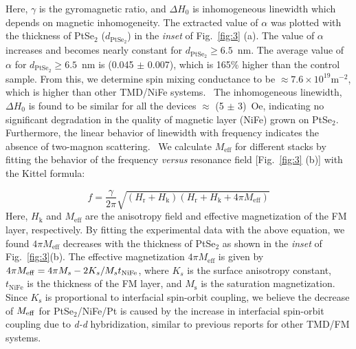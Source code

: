 \documentclass[journal=jacsat,manuscript=article]{achemso}
\begin{document}
 Here, $\gamma$ is the gyromagnetic ratio, and $\Delta H_0$ is inhomogeneous linewidth which depends on magnetic inhomogeneity. The extracted value of $\alpha$ was plotted with the thickness of PtSe$_2$ ($d_\mathrm{PtSe_2}$) in the \textit{inset} of Fig.~\ref{fig:3} (a). 
 The value of $\alpha$ increases and becomes nearly constant for $d_\mathrm{PtSe_2}\geq 6.5$~nm. The average value of $\alpha$ for $d_\mathrm{PtSe_2}\geq 6.5$~nm is (0.045 $\pm$ 0.007), which is 165\% higher than the control sample. From this, we determine spin mixing conductance to be $\approx 7.6\times10^{19}\textrm{m}^{-2}$, which is higher than other TMD/NiFe systems.~\cite{bangar2022large, bansal2019extrinsic} The inhomogeneous linewidth, $\Delta H_0$ is found to be similar for all the devices $\approx$ (5 $\pm$ 3)~Oe,  indicating no significant degradation in the quality of magnetic layer (NiFe) grown on PtSe$_2$. Furthermore, the linear behavior of linewidth with frequency indicates the absence of two-magnon scattering.~\cite{arias1999extrinsic}
 We calculate $M_{\mathrm{eff}}$ for different stacks by fitting the behavior of the frequency \textit{versus} resonance field [Fig.~\ref{fig:3} (b)] with the Kittel formula: 
 
\begin{equation}\label{kittel}
 f=\frac{\gamma}{2\pi}\sqrt{(H_\mathrm{r}+H_\mathrm{k})(H_\mathrm{r}+H_\mathrm{k}+4\pi M_{\mathrm{eff}})}
\end{equation}
Here, $H_\mathrm{k}$ and $M_{\mathrm{eff}}$ are the anisotropy field and effective magnetization of the FM layer, respectively. By fitting the experimental data with the above equation, we found $4\pi M_\mathrm{eff}$ decreases with the thickness of PtSe$_2$ as shown in the \textit{inset} of Fig.~\ref{fig:3}(b). The effective magnetization $4\pi$$M_\mathrm{eff}$ is given by $4\pi M_\mathrm{eff}=4\pi M_s-2K_s/M_s t_{\rm{NiFe}}$, where $K_s$ is the surface anisotropy constant, $t_\mathrm{NiFe}$ is the thickness of the FM layer, and $M_\mathrm{s}$ is the saturation magnetization. Since $K_\mathrm{s}$ is proportional to interfacial spin-orbit coupling, we believe the decrease of $M_{\rm {eff}}$ for PtSe$_2$/NiFe/Pt is caused by the increase in interfacial spin-orbit coupling due to \textit{d-d} hybridization, similar to previous reports for other TMD/FM systems.~\cite{wu2020tuning, jamilpanah2020interfacial}
\end{document}
